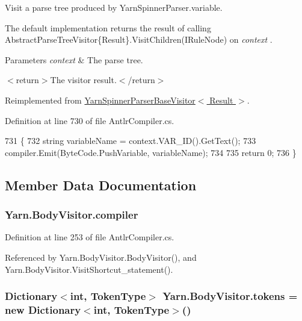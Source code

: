 Visit a parse tree produced by Yarn\-Spinner\-Parser.\-variable. 

The default implementation returns the result of calling Abstract\-Parse\-Tree\-Visitor\{\-Result\}.\-Visit\-Children(\-I\-Rule\-Node) on {\itshape context} . 


\begin{DoxyParams}{Parameters}
{\em context} & The parse tree.\\
\hline
\end{DoxyParams}
$<$return$>$The visitor result.$<$/return$>$ 

Reimplemented from \hyperlink{a00187_a51d3d21fc833b5b4676ac84a46cdef87}{Yarn\-Spinner\-Parser\-Base\-Visitor$<$ Result $>$}.



Definition at line 730 of file Antlr\-Compiler.\-cs.


\begin{DoxyCode}
731         \{
732             \textcolor{keywordtype}{string} variableName = context.VAR\_ID().GetText();
733             compiler.Emit(ByteCode.PushVariable, variableName);
734 
735             \textcolor{keywordflow}{return} 0;
736         \}
\end{DoxyCode}


\subsection{Member Data Documentation}
\hypertarget{a00034_a39d71c6de5e1c9f7d2f78ac2ccd5743d}{
\subsubsection[{compiler}]{ Yarn.\-Body\-Visitor.\-compiler\hspace{0.3cm}{\ttfamily [package]}}}\label{a00034_a39d71c6de5e1c9f7d2f78ac2ccd5743d}


Definition at line 253 of file Antlr\-Compiler.\-cs.



Referenced by Yarn.\-Body\-Visitor.\-Body\-Visitor(), and Yarn.\-Body\-Visitor.\-Visit\-Shortcut\-\_\-statement().

\hypertarget{a00034_ab8aa4dbe47a807e3d973df2b85e3fffc}{
\subsubsection[{tokens}]{\setlength{\rightskip}{0pt plus 5cm}Dictionary$<$int, {\bf Token\-Type}$>$ Yarn.\-Body\-Visitor.\-tokens = new Dictionary$<$int, {\bf Token\-Type}$>$()\hspace{0.3cm}{\ttfamily [private]}}}\label{a00034_ab8aa4dbe47a807e3d973df2b85e3fffc}


